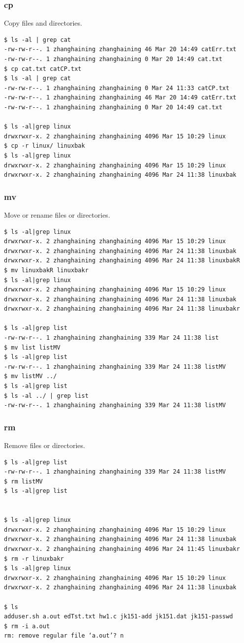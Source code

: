 \subsubsection{cp}
Copy files and directories.
\begin{verbatim}
$ ls -al | grep cat
-rw-rw-r--. 1 zhanghaining zhanghaining 46 Mar 20 14:49 catErr.txt
-rw-rw-r--. 1 zhanghaining zhanghaining 0 Mar 20 14:49 cat.txt
$ cp cat.txt catCP.txt
$ ls -al | grep cat
-rw-rw-r--. 1 zhanghaining zhanghaining 0 Mar 24 11:33 catCP.txt
-rw-rw-r--. 1 zhanghaining zhanghaining 46 Mar 20 14:49 catErr.txt
-rw-rw-r--. 1 zhanghaining zhanghaining 0 Mar 20 14:49 cat.txt

$ ls -al|grep linux
drwxrwxr-x. 2 zhanghaining zhanghaining 4096 Mar 15 10:29 linux
$ cp -r linux/ linuxbak
$ ls -al|grep linux
drwxrwxr-x. 2 zhanghaining zhanghaining 4096 Mar 15 10:29 linux
drwxrwxr-x. 2 zhanghaining zhanghaining 4096 Mar 24 11:38 linuxbak
\end{verbatim}

\subsubsection{mv}
Move or rename files or directories.
\begin{verbatim}
$ ls -al|grep linux
drwxrwxr-x. 2 zhanghaining zhanghaining 4096 Mar 15 10:29 linux
drwxrwxr-x. 2 zhanghaining zhanghaining 4096 Mar 24 11:38 linuxbak
drwxrwxr-x. 2 zhanghaining zhanghaining 4096 Mar 24 11:38 linuxbakR
$ mv linuxbakR linuxbakr
$ ls -al|grep linux
drwxrwxr-x. 2 zhanghaining zhanghaining 4096 Mar 15 10:29 linux
drwxrwxr-x. 2 zhanghaining zhanghaining 4096 Mar 24 11:38 linuxbak
drwxrwxr-x. 2 zhanghaining zhanghaining 4096 Mar 24 11:38 linuxbakr

$ ls -al|grep list
-rw-rw-r--. 1 zhanghaining zhanghaining 339 Mar 24 11:38 list
$ mv list listMV
$ ls -al|grep list
-rw-rw-r--. 1 zhanghaining zhanghaining 339 Mar 24 11:38 listMV
$ mv listMV ../
$ ls -al|grep list
$ ls -al ../ | grep list
-rw-rw-r--. 1 zhanghaining zhanghaining 339 Mar 24 11:38 listMV
\end{verbatim}

\subsubsection{rm}
Remove files or directories.
\begin{verbatim}
$ ls -al|grep list
-rw-rw-r--. 1 zhanghaining zhanghaining 339 Mar 24 11:38 listMV
$ rm listMV
$ ls -al|grep list


$ ls -al|grep linux
drwxrwxr-x. 2 zhanghaining zhanghaining 4096 Mar 15 10:29 linux
drwxrwxr-x. 2 zhanghaining zhanghaining 4096 Mar 24 11:38 linuxbak
drwxrwxr-x. 2 zhanghaining zhanghaining 4096 Mar 24 11:45 linuxbakr
$ rm -r linuxbakr
$ ls -al|grep linux
drwxrwxr-x. 2 zhanghaining zhanghaining 4096 Mar 15 10:29 linux
drwxrwxr-x. 2 zhanghaining zhanghaining 4096 Mar 24 11:38 linuxbak

$ ls
adduser.sh a.out edTst.txt hw1.c jk151-add jk151.dat jk151-passwd
$ rm -i a.out
rm: remove regular file ‘a.out’? n
\end{verbatim}

